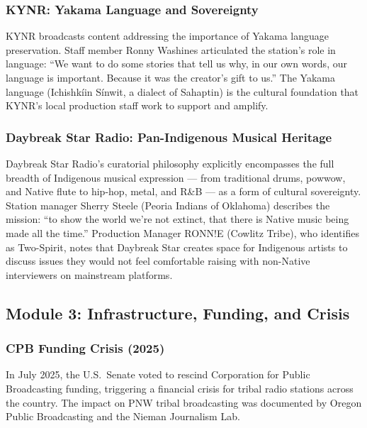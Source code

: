 \documentclass[11pt,letterpaper]{article}
\begin{document}
\subsubsection{KYNR: Yakama Language and Sovereignty}

KYNR broadcasts content addressing the importance of Yakama language preservation. Staff member Ronny Washines articulated the station's role in language: ``We want to do some stories that tell us why, in our own words, our language is important. Because it was the creator's gift to us.'' The Yakama language (Ichishkíin Sínwit, a dialect of Sahaptin) is the cultural foundation that KYNR's local production staff work to support and amplify.

\subsubsection{Daybreak Star Radio: Pan-Indigenous Musical Heritage}

Daybreak Star Radio's curatorial philosophy explicitly encompasses the full breadth of Indigenous musical expression --- from traditional drums, powwow, and Native flute to hip-hop, metal, and R\&B --- as a form of cultural sovereignty. Station manager Sherry Steele (Peoria Indians of Oklahoma) describes the mission: ``to show the world we're not extinct, that there is Native music being made all the time.'' Production Manager RONN!E (Cowlitz Tribe), who identifies as Two-Spirit, notes that Daybreak Star creates space for Indigenous artists to discuss issues they would not feel comfortable raising with non-Native interviewers on mainstream platforms.

\subsection{Module 3: Infrastructure, Funding, and Crisis}

\subsubsection{CPB Funding Crisis (2025)}

In July 2025, the U.S.\ Senate voted to rescind Corporation for Public Broadcasting funding, triggering a financial crisis for tribal radio stations across the country. The impact on PNW tribal broadcasting was documented by Oregon Public Broadcasting and the Nieman Journalism Lab.
\end{document}
